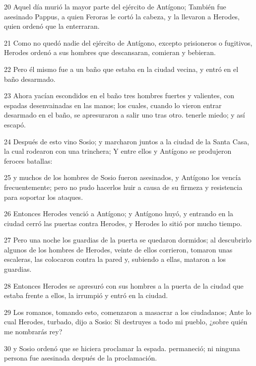 \par 20 Aquel día murió la mayor parte del ejército de Antígono; También fue asesinado Pappus, a quien Feroras le cortó la cabeza, y la llevaron a Herodes, quien ordenó que la enterraran.

\par 21 Como no quedó nadie del ejército de Antígono, excepto prisioneros o fugitivos, Herodes ordenó a sus hombres que descansaran, comieran y bebieran.

\par 22 Pero él mismo fue a un baño que estaba en la ciudad vecina, y entró en el baño desarmado.

\par 23 Ahora yacían escondidos en el baño tres hombres fuertes y valientes, con espadas desenvainadas en las manos; los cuales, cuando lo vieron entrar desarmado en el baño, se apresuraron a salir uno tras otro. tenerle miedo; y así escapó.

\par 24 Después de esto vino Sosio; y marcharon juntos a la ciudad de la Santa Casa, la cual rodearon con una trinchera; Y entre ellos y Antígono se produjeron feroces batallas:

\par 25 y muchos de los hombres de Sosio fueron asesinados, y Antígono los vencía frecuentemente; pero no pudo hacerlos huir a causa de su firmeza y resistencia para soportar los ataques.

\par 26 Entonces Herodes venció a Antígono; y Antígono huyó, y entrando en la ciudad cerró las puertas contra Herodes, y Herodes lo sitió por mucho tiempo.

\par 27 Pero una noche los guardias de la puerta se quedaron dormidos; al descubrirlo algunos de los hombres de Herodes, veinte de ellos corrieron, tomaron unas escaleras, las colocaron contra la pared y, subiendo a ellas, mataron a los guardias.

\par 28 Entonces Herodes se apresuró con sus hombres a la puerta de la ciudad que estaba frente a ellos, la irrumpió y entró en la ciudad.

\par 29 Los romanos, tomando esto, comenzaron a masacrar a los ciudadanos; Ante lo cual Herodes, turbado, dijo a Sosio: Si destruyes a todo mi pueblo, ¿sobre quién me nombrarás rey?

\par 30 y Sosio ordenó que se hiciera proclamar la espada. permaneció; ni ninguna persona fue asesinada después de la proclamación.

